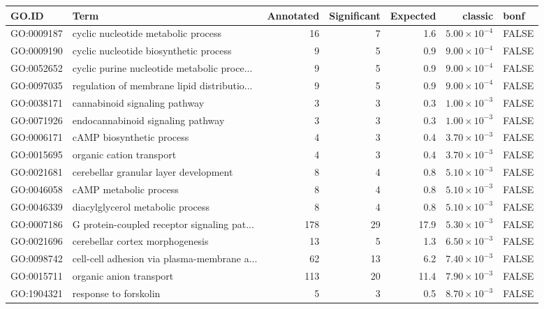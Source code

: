 \begin{table}[ht]
\centering
\begin{adjustbox}{max width=\textwidth}
\begin{tabular}{llrrrrl}
  \hline
GO.ID & Term & Annotated & Significant & Expected & classic & bonf \\ 
  \hline
GO:0009187 & cyclic nucleotide metabolic process & 16 & 7 & 1.6 & $5.00 \times 10^{-4}$ & FALSE \\ 
  GO:0009190 & cyclic nucleotide biosynthetic process & 9 & 5 & 0.9 & $9.00 \times 10^{-4}$ & FALSE \\ 
  GO:0052652 & cyclic purine nucleotide metabolic proce... & 9 & 5 & 0.9 & $9.00 \times 10^{-4}$ & FALSE \\ 
  GO:0097035 & regulation of membrane lipid distributio... & 9 & 5 & 0.9 & $9.00 \times 10^{-4}$ & FALSE \\ 
  GO:0038171 & cannabinoid signaling pathway & 3 & 3 & 0.3 & $1.00 \times 10^{-3}$ & FALSE \\ 
  GO:0071926 & endocannabinoid signaling pathway & 3 & 3 & 0.3 & $1.00 \times 10^{-3}$ & FALSE \\ 
  GO:0006171 & cAMP biosynthetic process & 4 & 3 & 0.4 & $3.70 \times 10^{-3}$ & FALSE \\ 
  GO:0015695 & organic cation transport & 4 & 3 & 0.4 & $3.70 \times 10^{-3}$ & FALSE \\ 
  GO:0021681 & cerebellar granular layer development & 8 & 4 & 0.8 & $5.10 \times 10^{-3}$ & FALSE \\ 
  GO:0046058 & cAMP metabolic process & 8 & 4 & 0.8 & $5.10 \times 10^{-3}$ & FALSE \\ 
  GO:0046339 & diacylglycerol metabolic process & 8 & 4 & 0.8 & $5.10 \times 10^{-3}$ & FALSE \\ 
  GO:0007186 & G protein-coupled receptor signaling pat... & 178 & 29 & 17.9 & $5.30 \times 10^{-3}$ & FALSE \\ 
  GO:0021696 & cerebellar cortex morphogenesis & 13 & 5 & 1.3 & $6.50 \times 10^{-3}$ & FALSE \\ 
  GO:0098742 & cell-cell adhesion via plasma-membrane a... & 62 & 13 & 6.2 & $7.40 \times 10^{-3}$ & FALSE \\ 
  GO:0015711 & organic anion transport & 113 & 20 & 11.4 & $7.90 \times 10^{-3}$ & FALSE \\ 
  GO:1904321 & response to forskolin & 5 & 3 & 0.5 & $8.70 \times 10^{-3}$ & FALSE \\ 

\end{tabular}
\end{adjustbox}
\end{table}
